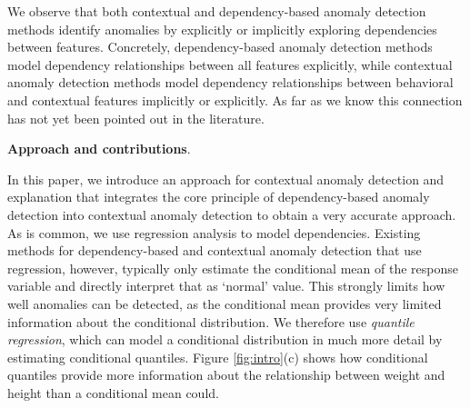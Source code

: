 \documentclass[pdflatex,sn-basic]{sn-jnl}%
\theoremstyle{thmstyleone}%
\theoremstyle{thmstyletwo}%
\theoremstyle{thmstylethree}%
\begin{document}
We observe that both contextual and dependency-based anomaly detection methods identify anomalies by explicitly or implicitly exploring dependencies between features. Concretely, dependency-based anomaly detection methods model dependency relationships between all features explicitly, while contextual anomaly detection methods model dependency relationships between behavioral and contextual features implicitly or explicitly. As far as we know this connection has not yet been pointed out in the literature. 

\smallskip \noindent
\textbf{Approach and contributions}. 

In this paper, we introduce an approach for contextual anomaly detection and explanation that integrates the core principle of dependency-based anomaly detection into contextual anomaly detection to obtain a very accurate approach. As is common, we use regression analysis to model dependencies. Existing methods for dependency-based and contextual anomaly detection that use regression, however, typically only estimate the conditional mean of the response variable and directly interpret that as `normal' value. This strongly limits how well anomalies can be detected, as the conditional mean provides very limited information about the conditional distribution. We therefore use \emph{quantile regression}, which can model a conditional distribution in much more detail by estimating conditional quantiles. Figure \ref{fig:intro}(c) shows how conditional quantiles provide more information about the relationship between weight and height than a conditional mean could. 
\end{document}
